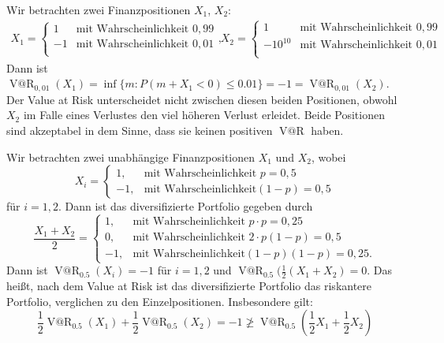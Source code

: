 \documentclass[a4paper,twoside,DIV15,BCOR12mm]{scrbook}
\makeatletter
\DeclareMathOperator{\VatR}{V@R}
\makeatother
\begin{document}
\begin{beispiel}
Wir betrachten zwei Finanzpositionen $X_1$, $X_2$:
\begin{align*}
X_1 =
\begin{cases}
1& \text{mit Wahrscheinlichkeit } 0,99\\
-1& \text{mit Wahrscheinlichkeit } 0,01\\
\end{cases},
&&
X_2 =
\begin{cases}
1& \text{mit Wahrscheinlichkeit } 0,99\\
-10^{10} & \text{mit Wahrscheinlichkeit } 0,01\\
\end{cases}
\end{align*}
Dann ist $\VatR_{0,01}(X_1) = \inf\{m: P(m + X_1<0) \le 0.01\} = -1 = \VatR_{0,01}(X_2)$. Der Value at Risk unterscheidet nicht zwischen diesen beiden Positionen, obwohl $X_2$ im Falle eines Verlustes den viel höheren Verlust erleidet. Beide Positionen sind akzeptabel in dem Sinne, dass sie keinen positiven $\VatR$ haben.
\end{beispiel}


\begin{beispiel}
Wir betrachten zwei unabhängige Finanzpositionen $X_1$ und $X_2$, wobei 
\[
X_i=
\begin{cases}
1,& \text{mit Wahrscheinlichkeit } p=0,5\\
-1,& \text{mit Wahrscheinlichkeit} (1-p)=0,5
\end{cases}
\]
für $i=1,2$.
Dann ist das diversifizierte Portfolio gegeben durch 
\[
\frac {X_1+X_2}2 = 
\begin{cases}
1,& \text{mit Wahrscheinlichkeit } p\cdot p=0,25\\
0,& \text{mit Wahrscheinlichkeit } 2\cdot p(1-p) = 0,5\\
-1,& \text{mit Wahrscheinlichkeit} (1-p)(1-p)=0,25.
\end{cases}
\]
Dann ist $\VatR_{0.5}(X_i) = -1$ für $i=1,2$ und $\VatR_{0.5}(\frac12(X_1+X_2)=0$. Das heißt, nach dem Value at Risk ist das diversifizierte Portfolio das riskantere Portfolio, verglichen zu den Einzelpositionen. Insbesondere gilt:
\[
\frac12\VatR_{0.5}(X_1) + \frac 12\VatR_{0.5}(X_2) = -1 \not\ge 
\VatR_{0.5}(\frac 12 X_1 + \frac 12 X_2)
\]
\end{beispiel}
\end{document}
